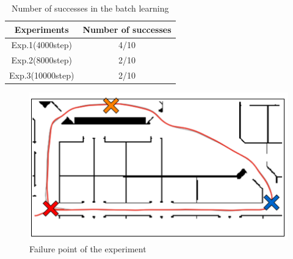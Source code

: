 


\newpage
\begin{table}[h]
  \centering
  \begin{tabular}{|c|c|} \hline
    Experiments & Number of successes \\ \hline
    Exp.1(4000step) & 4/10 \\ \hline
    Exp.2(8000step) & 2/10 \\ \hline
    Exp.3(10000step) & 2/10 \\ \hline
  \end{tabular}
  \caption{Number of successes in the batch learning}
  \label{tb:exp1.2}
\end{table}

\begin{figure}[h]
  \centering
  \includegraphics[keepaspectratio, scale=0.5]{images/result1.2.png}
  \caption{Failure point of the experiment}
  \label{Fig:result1.2}
  \end{figure}

